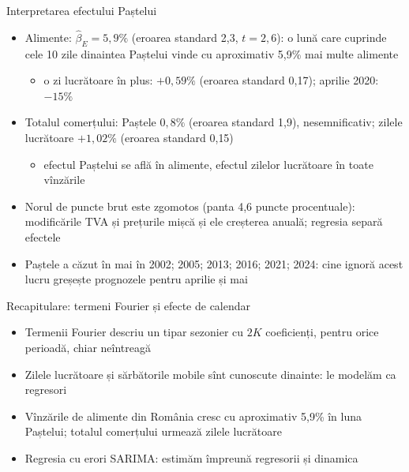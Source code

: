 \begin{frame}{Interpretarea efectului Paștelui}
\itemsize{\footnotesize}
\begin{itemize}
    \item Alimente: $\hat\beta_E = 5{,}9\%$ (eroarea standard 2{,}3, $t = 2{,}6$): o lună care cuprinde cele 10 zile dinaintea Paștelui vinde cu aproximativ 5{,}9\% mai multe alimente
    \begin{itemize}
        \item o zi lucrătoare în plus: $+0{,}59\%$ (eroarea standard 0{,}17); aprilie 2020: $\ensuremath{-}15\%$
    \end{itemize}
    \item Totalul comerțului: Paștele $0{,}8\%$ (eroarea standard 1{,}9), nesemnificativ; zilele lucrătoare $+1{,}02\%$ (eroarea standard 0{,}15)
    \begin{itemize}
        \item efectul Paștelui se află în alimente, efectul zilelor lucrătoare în toate vînzările
    \end{itemize}
    \item Norul de puncte brut este zgomotos (panta 4{,}6 puncte procentuale): modificările TVA și prețurile mișcă și ele creșterea anuală; regresia separă efectele
    \item Paștele a căzut în mai în 2002; 2005; 2013; 2016; 2021; 2024: cine ignoră acest lucru greșește prognozele pentru aprilie și mai
\end{itemize}
\end{frame}

\begin{frame}{Recapitulare: termeni Fourier și efecte de calendar}
\itemsize{\small}
\begin{itemize}
    \item Termenii Fourier descriu un tipar sezonier cu $2K$ coeficienți, pentru orice perioadă, chiar neîntreagă
    \item Zilele lucrătoare și sărbătorile mobile sînt cunoscute dinainte: le modelăm ca regresori
    \item Vînzările de alimente din România cresc cu aproximativ 5{,}9\% în luna Paștelui; totalul comerțului urmează zilele lucrătoare
    \item Regresia cu erori SARIMA: estimăm împreună regresorii și dinamica
\end{itemize}
\end{frame}


